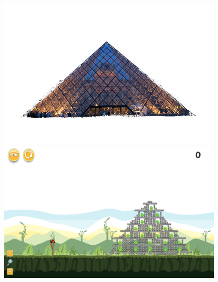 \documentclass{dalthesis}
\begin{document}
\begin{figure}
  \includegraphics[width=\textwidth,height=\textheight,keepaspectratio]{levels/pictures/buildings/louvre_pyramid.jpg}
  \includegraphics[width=\textwidth,height=\textheight,keepaspectratio]{levels/screenshots/buildings/louvre_pyramid.png}
\end{figure}
\end{document}
